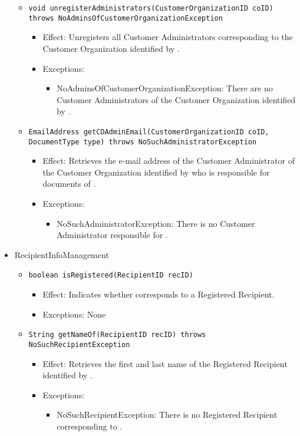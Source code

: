 \begin{itemize}
\begin{itemize}
		\item \texttt{void unregisterAdministrators(CustomerOrganizationID coID) throws NoAdminsOfCustomerOrganizationException}
        \begin{itemize}
            \item Effect: Unregisters all Customer Administrators corresponding to the Customer Organization identified by .
            \item Exceptions:
			\begin{itemize}
				\item NoAdminsOfCustomerOrganizationException: There are no Customer Administrators of the Customer Organization identified by .
			\end{itemize}
        \end{itemize}

		\item \texttt{EmailAddress getCOAdminEmail(CustomerOrganizationID coID, DocumentType type) throws NoSuchAdministratorException}
		    \begin{itemize}
                \item Effect: Retrieves the e-mail address of the Customer Administrator of the Customer Organization identified by  who is responsible for documents of .
                \item Exceptions:
				\begin{itemize}
					\item NoSuchAdministratorException: There is no Customer Administrator responsible for .
				\end{itemize}
            \end{itemize}
    \end{itemize}

    \item RecipientInfoManagement
    \begin{itemize}
        \item \texttt{boolean isRegistered(RecipientID recID)}
        \begin{itemize}
            \item Effect: Indicates whether  corresponds to a Registered Recipient.
            \item Exceptions: None
        \end{itemize}

		\item \texttt{String getNameOf(RecipientID recID) throws NoSuchRecipientException}
        \begin{itemize}
            \item Effect: Retrieves the first and last name of the Registered Recipient identified by .
            \item Exceptions:
			\begin{itemize}
				\item NoSuchRecipientException: There is no Registered Recipient corresponding to .
			\end{itemize}
        \end{itemize}


\end{itemize}
\end{itemize}
